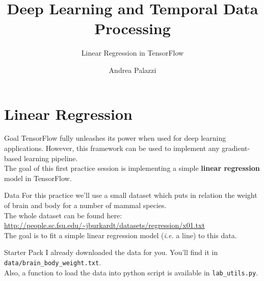 \documentclass[aspectratio=169]{beamer}
\title[Deep Learning and Temporal Data Processing]{Deep Learning and Temporal Data Processing}
\subtitle{Linear Regression in TensorFlow}
\institute{University of Modena and Reggio Emilia}
\author{Andrea Palazzi}
\def\thisframelogos{}
\newcommand{\framelogo}[1]{\def\thisframelogos{#1}}
\begin{document}
\framelogo{img/template/logo_unimore_white.png}





\section{Linear Regression}

\begin{frame}{Goal}
TensorFlow fully unleashes its power when used for deep learning applications. However, this framework can be used to implement any gradient-based learning pipeline.\\
\vspace{0.5cm}
The goal of this first practice session is implementing a simple \textbf{linear regression} model in TensorFlow\cite{tensorflow2015-whitepaper}.
\end{frame}


\begin{frame}{Data}
For this practice we'll use a small dataset which puts in relation the weight of brain and body for a number of mammal species.\\
\vspace{0.5cm}
The whole dataset can be found here:\\
\url{http://people.sc.fsu.edu/~jburkardt/datasets/regression/x01.txt}\\
\vspace{0.5cm}
The goal is to fit a simple linear regression model (\textit{i.e.} a line) to this data.
\end{frame}


\begin{frame}{Starter Pack}
I already downloaded the data for you. You'll find it in \texttt{data/brain\_body\_weight.txt}.\\
\vspace{0.5cm}
Also, a function to load the data into python script is available in \texttt{lab\_utils.py}.
\end{frame}

\end{document}
